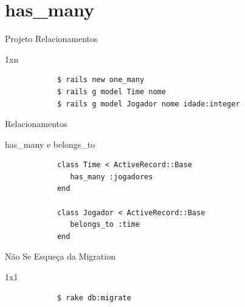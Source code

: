 \documentclass{beamer}
\begin{document}
%


\section{has\_many}
\begin{frame}[fragile]{Projeto Relacionamentos}
	\begin{block} {1xn}
		\begin{verbatim}
		  	$ rails new one_many
		  	$ rails g model Time nome 
		  	$ rails g model Jogador nome idade:integer
		\end{verbatim}
	\end{block}
\end{frame}

\begin{frame}[fragile]{Relacionamentos}
	\begin{block} {\LARGE has\_many e belongs\_to}
		\begin{verbatim}
		  	class Time < ActiveRecord::Base
		  	   has_many :jogadores
		  	end
		  	
		  	class Jogador < ActiveRecord::Base
		  	   belongs_to :time
		  	end
		\end{verbatim}
	\end{block}
\end{frame}

\begin{frame}[fragile]{Não Se Esqueça da Migration}
	\begin{block} {1x1}
		\begin{verbatim}
		  	$ rake db:migrate
		\end{verbatim}
	\end{block}
\end{frame}
\end{document}
